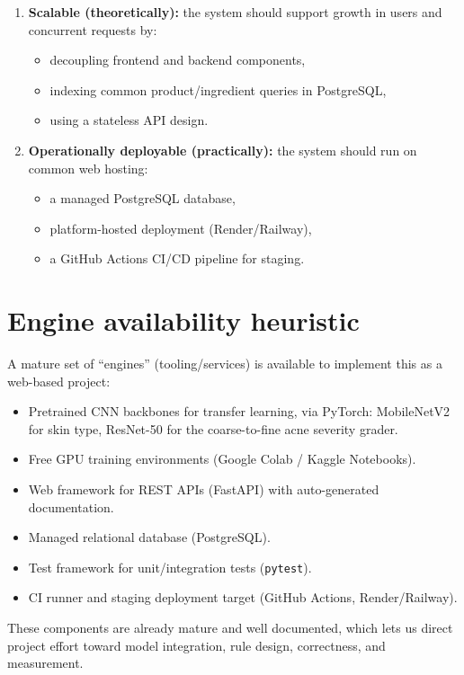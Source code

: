 \documentclass[11pt,a4paper]{article}
\begin{document}
\begin{enumerate}[leftmargin=0.7cm]
    \item \textbf{Scalable (theoretically):} the system should support growth in users and concurrent requests by:
    \begin{itemize}[leftmargin=0.7cm]
        \item decoupling frontend and backend components,
        \item indexing common product/ingredient queries in PostgreSQL,
        \item using a stateless API design.
    \end{itemize}

    \item \textbf{Operationally deployable (practically):} the system should run on common web hosting:
    \begin{itemize}[leftmargin=0.7cm]
        \item a managed PostgreSQL database,
        \item platform-hosted deployment (Render/Railway),
        \item a GitHub Actions CI/CD pipeline for staging.
    \end{itemize}
\end{enumerate}

\section{Engine availability heuristic}
A mature set of ``engines'' (tooling/services) is
available to implement this as a web-based project:
\begin{itemize}[leftmargin=0.7cm]
    \item Pretrained CNN backbones for transfer learning, via PyTorch: MobileNetV2 for skin type, ResNet-50 for the coarse-to-fine acne severity grader.
    \item Free GPU training environments (Google Colab / Kaggle Notebooks).
    \item Web framework for REST APIs (FastAPI) with auto-generated documentation.
    \item Managed relational database (PostgreSQL).
    \item Test framework for unit/integration tests (\texttt{pytest}).
    \item CI runner and staging deployment target (GitHub Actions, Render/Railway).
\end{itemize}
These components are already mature and well documented,
which lets us direct project effort toward model
integration, rule design, correctness, and measurement.
\end{document}
